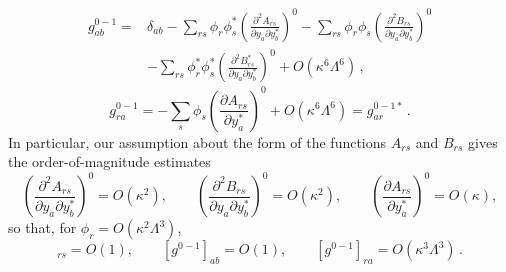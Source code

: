 \begin{equation}
  \begin{aligned}
  g_{ab}^{0-1}={}&\delta_{ab}
  -\sum_{rs}\phi_r\phi_s^*
    \left(\frac{\partial^2A_{rs}}
      {\partial y_a\partial y_b^*}\right)^0
  -\sum_{rs}\phi_r\phi_s
    \left(\frac{\partial^2B_{rs}}
      {\partial y_a\partial y_b^*}\right)^0
  \\
  &-\sum_{rs}\phi_r^*\phi_s^*
    \left(\frac{\partial^2B_{rs}^*}
      {\partial y_a\partial y_b^*}\right)^0
  +O(\kappa^6\Lambda^6)\,,
  \end{aligned}
  \tag{31.7.30}\label{eq:31.7.30}
\end{equation}
\begin{equation}
  g_{ra}^{0-1}
  =-\sum_s\phi_s
    \left(\frac{\partial A_{rs}}{\partial y_a^*}\right)^0
   +O(\kappa^6\Lambda^6)
  =g_{ar}^{0-1*}\,.
  \tag{31.7.31}\label{eq:31.7.31}
\end{equation}
In particular, our assumption about the form of the functions \(A_{rs}\)
and \(B_{rs}\) gives the order-of-magnitude estimates
\begin{equation}
  \left(\frac{\partial^2A_{rs}}
    {\partial y_a\partial y_b^*}\right)^0=O(\kappa^2),
  \qquad
  \left(\frac{\partial^2B_{rs}}
    {\partial y_a\partial y_b^*}\right)^0=O(\kappa^2),
  \qquad
  \left(\frac{\partial A_{rs}}{\partial y_a^*}\right)^0=O(\kappa),
  \tag{31.7.32}\label{eq:31.7.32}
\end{equation}
so that, for \(\phi_r=O(\kappa^2\Lambda^3)\),
\begin{equation}
  [g^{0-1}]_{rs}=O(1),\qquad
  [g^{0-1}]_{ab}=O(1),\qquad
  [g^{0-1}]_{ra}=O(\kappa^3\Lambda^3)\,.
  \tag{31.7.33}\label{eq:31.7.33}
\end{equation}

